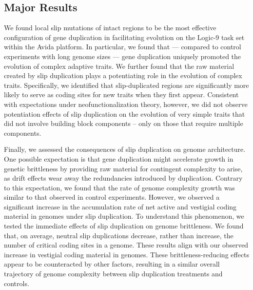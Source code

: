 \subsection{Major Results}

We found local slip mutations of intact regions to be the most effective configuration of gene duplication in facilitating evolution on the Logic-9 task set within the Avida platform.
In particular, we found that --- compared to control experiments with long genome sizes --- gene duplication uniquely promoted the evolution of complex adaptive traits.
We further found that the raw material created by slip duplication plays a potentiating role in the evolution of complex traits.
Specifically, we identified that slip-duplicated regions are significantly more likely to serve as coding sites for new traits when they first appear.
Consistent with expectations under neofunctionalization theory, however, we did not observe potentiation effects of slip duplication on the evolution of very simple traits that did not involve building block components -- only on those that require multiple components.

Finally, we assessed the consequences of slip duplication on genome architecture.
One possible expectation is that gene duplication might accelerate growth in genetic brittleness by providing raw material for contingent complexity to arise, as drift effects wear away the redundancies introduced by duplication.
Contrary to this expectation, we found that the rate of genome complexity growth was similar to that observed in control experiments.
However, we observed a significant increase in the accumulation rate of net active and vestigial coding material in genomes under slip duplication.
To understand this phenomenon, we tested the immediate effects of slip duplication on genome brittleness.
We found that, on average, neutral slip duplications decrease, rather than increase, the number of critical coding sites in a genome.
These results align with our observed increase in vestigial coding material in genomes.
These brittleness-reducing effects appear to be counteracted by other factors, resulting in a similar overall trajectory of genome complexity between slip duplication treatments and controls.
